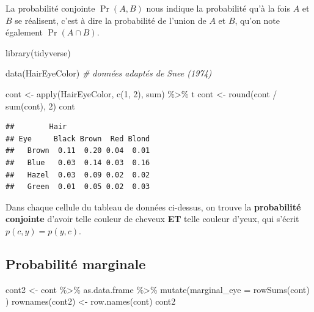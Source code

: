 \documentclass[
  a4paper,11pt,twoside,onecolumn,openright,final,oldfontcommands]{memoir}
\newenvironment{Shaded}{\begin{snugshade}}{\end{snugshade}}
\newcommand{\AttributeTok}[1]{\textcolor[rgb]{0.77,0.63,0.00}{#1}}
\newcommand{\CommentTok}[1]{\textcolor[rgb]{0.56,0.35,0.01}{\textit{#1}}}
\newcommand{\DecValTok}[1]{\textcolor[rgb]{0.00,0.00,0.81}{#1}}
\newcommand{\FunctionTok}[1]{\textcolor[rgb]{0.00,0.00,0.00}{#1}}
\newcommand{\NormalTok}[1]{#1}
\newcommand{\OtherTok}[1]{\textcolor[rgb]{0.56,0.35,0.01}{#1}}
\newcommand{\SpecialCharTok}[1]{\textcolor[rgb]{0.00,0.00,0.00}{#1}}
\theoremstyle{definition}
\theoremstyle{definition}
\theoremstyle{definition}
\theoremstyle{remark}
\begin{document}
La probabilité conjointe \(\Pr(A, B)\) nous indique la probabilité qu'à la fois \(A\) et \(B\) se réalisent, c'est à dire la probabilité de l'union de \(A\) et \(B\), qu'on note également \(\Pr(A \cap B)\).

\begin{Shaded}
\begin{Highlighting}[]
\FunctionTok{library}\NormalTok{(tidyverse)}

\FunctionTok{data}\NormalTok{(HairEyeColor) }\CommentTok{\# données adaptés de Snee (1974)}

\NormalTok{cont }\OtherTok{\textless{}{-}} \FunctionTok{apply}\NormalTok{(HairEyeColor, }\FunctionTok{c}\NormalTok{(}\DecValTok{1}\NormalTok{, }\DecValTok{2}\NormalTok{), sum) }\SpecialCharTok{\%\textgreater{}\%}\NormalTok{ t }
\NormalTok{cont }\OtherTok{\textless{}{-}} \FunctionTok{round}\NormalTok{(cont }\SpecialCharTok{/} \FunctionTok{sum}\NormalTok{(cont), }\DecValTok{2}\NormalTok{)}
\NormalTok{cont}
\end{Highlighting}
\end{Shaded}

\begin{verbatim}
##        Hair
## Eye     Black Brown  Red Blond
##   Brown  0.11  0.20 0.04  0.01
##   Blue   0.03  0.14 0.03  0.16
##   Hazel  0.03  0.09 0.02  0.02
##   Green  0.01  0.05 0.02  0.03
\end{verbatim}

Dans chaque cellule du tableau de données ci-dessus, on trouve la \textbf{probabilité conjointe} d'avoir telle couleur de cheveux \textbf{ET} telle couleur d'yeux, qui s'écrit \(p(c, y) = p(y, c)\).

\hypertarget{probabilituxe9-marginale}{%
\subsection{Probabilité marginale}\label{probabilituxe9-marginale}}

\begin{Shaded}
\begin{Highlighting}[]
\NormalTok{cont2 }\OtherTok{\textless{}{-}}\NormalTok{ cont }\SpecialCharTok{\%\textgreater{}\%}\NormalTok{ as.data.frame }\SpecialCharTok{\%\textgreater{}\%} \FunctionTok{mutate}\NormalTok{(}\AttributeTok{marginal\_eye =} \FunctionTok{rowSums}\NormalTok{(cont) )}
\FunctionTok{rownames}\NormalTok{(cont2) }\OtherTok{\textless{}{-}} \FunctionTok{row.names}\NormalTok{(cont)}
\NormalTok{cont2}
\end{Highlighting}
\end{Shaded}
\end{document}
